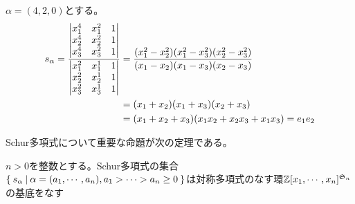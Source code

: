 \documentclass{ltjsreport}
\begin{document}
\begin{eg}
    $\alpha=(4,2,0)$とする。
    \begin{align*}
        s_\alpha=\frac{\begin{vmatrix} x_1^4&x_1^2&1\\
                             x_2^4&x_2^2&1\\
                             x_3^4&x_3^2&1 \end{vmatrix}}
                      {\begin{vmatrix} x_1^2&x_1^1&1\\
                             x_2^2&x_2^1&1\\
                             x_3^2&x_3^1&1 \end{vmatrix}}
                &=\frac{(x_1^2-x_2^2)(x_1^2-x_3^2)(x_2^2-x_3^2)}{(x_1-x_2)(x_1-x_3)(x_2-x_3)}\\
                &=(x_1+x_2)(x_1+x_3)(x_2+x_3)\\
                &=(x_1+x_2+x_3)(x_1x_2+x_2x_3+x_1x_3)=e_1e_2
    \end{align*}
\end{eg}


Schur多項式について重要な命題が次の定理である。

\begin{theo}\label{schur}
    $n>0$を整数とする。Schur多項式の集合$\left\{\:s_\alpha\:\middle|\:\alpha=(a_1,\cdots,a_n), a_1> \cdots> a_n\geq 0\:\right\}$は対称多項式のなす環$\mathbb{Z}[x_1,\cdots,x_n]^{\mathfrak{S}_n}$の基底をなす
\end{theo}
\end{document}
